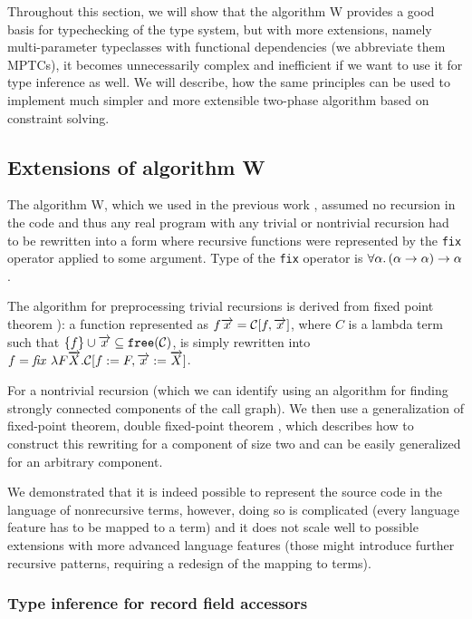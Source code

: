 Throughout this section, we will show that the algorithm W provides a good basis for typechecking of the type system, but with more extensions, namely multi-parameter typeclasses with functional dependencies \cite{jones2000type} (we abbreviate them MPTCs), it becomes unnecessarily complex and inefficient if we want to use it for type inference as well. We will describe, how the same principles can be used to implement much simpler and more extensible two-phase algorithm based on constraint solving.

\subsection{Extensions of algorithm W}

The algorithm W, which we used in the previous work \cite{klepl2020type}, assumed no recursion in the code and thus any real program with any trivial or nontrivial recursion had to be rewritten into a form where recursive functions were represented by the \lstinline{fix} operator applied to some argument. Type of the \lstinline{fix} operator is $\forall \alpha . \left(\alpha \to \alpha\right) \to \alpha$.

The algorithm for preprocessing trivial recursions is derived from fixed point theorem \cite{barendregt1992lambda,damas1982principal}): a function represented as $f \overrightarrow{x} = \mathcal{C}[f, \overrightarrow{x}]$, where $C$ is a lambda term such that $\{f\} \cup \overrightarrow{x} \subseteq \mathtt{free} (\mathcal{C})$, is simply rewritten into $f = \mathit{fix}\ \lambda F \overrightarrow{X} .\mathcal{C}[f := F, \overrightarrow{x} := \overrightarrow{X}]$.

For a nontrivial recursion (which we can identify using an algorithm for finding strongly connected components of the call graph). We then use a generalization of fixed-point theorem, double fixed-point theorem \cite{stepanek}, which describes how to construct this rewriting for a component of size two and can be easily generalized for an arbitrary component.

We demonstrated that it is indeed possible to represent the source code in the language of nonrecursive terms, however, doing so is complicated (every language feature has to be mapped to a term) and it does not scale well to possible extensions with more advanced language features (those might introduce further recursive patterns, requiring a redesign of the mapping to terms).

\subsubsection{Type inference for record field accessors}
\label{ex_structs}

